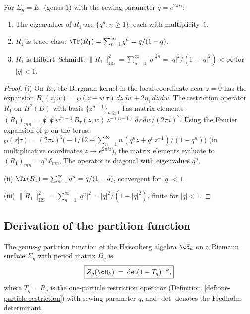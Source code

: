 \begin{proposition}
For $\Sigma_g = E_\tau$ \textup{(}genus $1$\textup{)} with the
sewing parameter $q = e^{2\pi i\tau}$:
\begin{enumerate}[label=\textup{(\roman*)}]
\item The eigenvalues of $R_1$ are $\{q^n : n \ge 1\}$, each
with multiplicity~$1$.
\item $R_1$ is trace class: $\Tr(R_1) = \sum_{n=1}^\infty q^n
= q/(1-q)$.
\item $R_1$ is Hilbert--Schmidt: $\|R_1\|_{\mathrm{HS}}^2
= \sum_{n=1}^\infty |q|^{2n} = |q|^2/(1-|q|^2) < \infty$ for
$|q| < 1$.
\end{enumerate}
\end{proposition}

\begin{proof}
(i) On $E_\tau$, the Bergman kernel in the local coordinate
near $z = 0$ has the expansion
$B_\tau(z, w) = \wp(z-w|\tau)\, dz\, dw + 2\eta_1\, dz\, dw$.
The restriction operator $R_1$ on $H^2(D)$ with basis
$\{z^{n-1}\}_{n \ge 1}$ has matrix elements
$(R_1)_{mn} = \oint \oint w^{m-1}\, B_\tau(z,w)\, z^{-(n+1)}\,
dz\, dw / (2\pi i)^2$. Using the Fourier expansion of $\wp$
on the torus: $\wp(z|\tau) = (2\pi i)^2\bigl(-1/12 + \sum_{n=1}^\infty
n\,(q^n z + q^n z^{-1})/(1-q^n)\bigr)$ (in multiplicative
coordinates $z \to e^{2\pi iz}$), the matrix elements evaluate
to $(R_1)_{mn} = q^n\, \delta_{mn}$. The operator is diagonal
with eigenvalues $q^n$.

(ii) $\Tr(R_1) = \sum_{n=1}^\infty q^n = q/(1-q)$, convergent
for $|q| < 1$.

(iii) $\|R_1\|_{\mathrm{HS}}^2 = \sum_{n=1}^\infty |q^n|^2
= |q|^2/(1 - |q|^2)$, finite for $|q| < 1$.
\end{proof}

\subsection{Derivation of the partition function}

\begin{theorem}
The genus-$g$ partition function of the Heisenberg algebra
$\cH_k$ on a Riemann surface $\Sigma_g$ with period matrix
$\Omega_g$ is
\begin{equation}
\boxed{
Z_g(\cH_k)
\;=\;
\det(1 - T_q)^{-k},
}
\end{equation}
where $T_q = R_g$ is the one-particle restriction operator
\textup{(}Definition~\textup{\ref{def:one-particle-restriction})}
with sewing parameter $q$, and $\det$ denotes the Fredholm
determinant.
\end{theorem}

